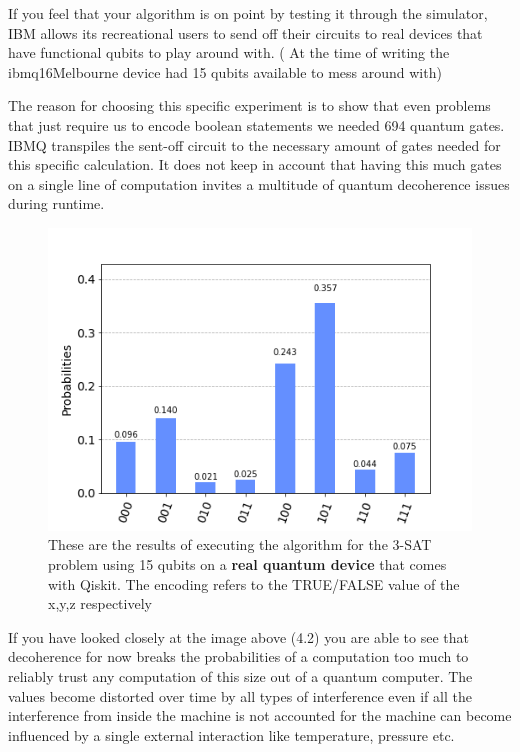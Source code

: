 If you feel that your algorithm is on point by testing it through the simulator, IBM allows its recreational users to send off their circuits to real devices that have functional qubits to play around with. ( At the time of writing the ibmq16Melbourne device had 15 qubits available to mess around with)

The reason for choosing this specific experiment is to show that even problems that just require us to encode boolean statements we needed 694 quantum gates. IBMQ transpiles the sent-off circuit to the necessary amount of gates needed for this specific calculation. It does not keep in account that having this much gates on a single line of computation invites a multitude of quantum decoherence issues during runtime.

\begin{figure}[h]
	\centering
	\includegraphics[scale = 0.75]{../Demonstration/img/real_device_3SAT.PNG}
	\caption{These are the results of executing the algorithm for the 3-SAT problem using 15 qubits on a \textbf{real quantum device} that comes with Qiskit. The encoding refers to the TRUE/FALSE value of the x,y,z respectively}
\end{figure}

If you have looked closely at the image above (4.2) you are able to see that decoherence for now breaks the probabilities of a computation too much to reliably trust any computation of this size out of a quantum computer. The values become distorted over time by all types of interference even if all the interference from inside the machine is not accounted for the machine can become influenced by a single external interaction like temperature, pressure etc. 



